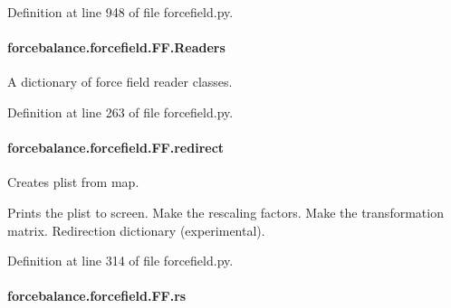 Definition at line 948 of file forcefield.\-py.

\hypertarget{classforcebalance_1_1forcefield_1_1FF_a9db381836dba8b531ff7d45dce877f4f}{
\paragraph[{Readers}]{\setlength{\rightskip}{0pt plus 5cm}forcebalance.\-forcefield.\-F\-F.\-Readers}}\label{classforcebalance_1_1forcefield_1_1FF_a9db381836dba8b531ff7d45dce877f4f}


A dictionary of force field reader classes. 



Definition at line 263 of file forcefield.\-py.

\hypertarget{classforcebalance_1_1forcefield_1_1FF_ada9b82220eb6e6335a36617dd5746695}{
\paragraph[{redirect}]{\setlength{\rightskip}{0pt plus 5cm}forcebalance.\-forcefield.\-F\-F.\-redirect}}\label{classforcebalance_1_1forcefield_1_1FF_ada9b82220eb6e6335a36617dd5746695}


Creates plist from map. 

Prints the plist to screen. Make the rescaling factors. Make the transformation matrix. Redirection dictionary (experimental). 

Definition at line 314 of file forcefield.\-py.

\hypertarget{classforcebalance_1_1forcefield_1_1FF_acf33c8285b56b92510b5572448c3358e}{
\paragraph[{rs}]{\setlength{\rightskip}{0pt plus 5cm}forcebalance.\-forcefield.\-F\-F.\-rs}}\label{classforcebalance_1_1forcefield_1_1FF_acf33c8285b56b92510b5572448c3358e}


